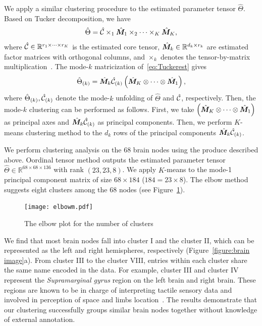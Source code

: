 \documentclass[11pt]{article}
\theoremstyle{plain}
\theoremstyle{definition}
\begin{document}
We apply a similar clustering procedure to the estimated parameter tensor $\hat\Theta$. Based on Tucker decomposition, we have
\begin{equation}\label{eq:Tuckerest}
\hat \Theta = \hat {\mathcal{C}}\times_1\hat {\bm M}_1\times_2\cdots\times_K\hat {\bm M}_K,
\end{equation}
where $\hat {\mathcal{C}}\in\mathbb{R}^{r_1\times \cdots \times r_K}$ is the estimated core tensor, $\hat {\bm M}_k\in\mathbb{R}^{d_k\times r_k}$ are estimated factor matrices with orthogonal columns, and $\times_k$ denotes the tensor-by-matrix multiplication~\citep{kolda2009tensor}. The mode-$k$ matricization of~\eqref{eq:Tuckerest} gives
\begin{equation}
\hat \Theta_{(k)} = \hat {\bm M}_k\hat {\mathcal{C}}_{(k)}\left(\hat {\bm M}_K\otimes\cdots\otimes\hat {\bm M}_1\right),
\end{equation}
where $\hat \Theta_{(k)} , \hat {\mathcal{C}}_{(k)}$ denote the mode-$k$ unfolding of $\hat \Theta$ and $\hat {\mathcal{C}}$, respectively. Then, the mode-$k$ clustering can be performed as follows. First, we take $\left(\hat {\bm M}_K\otimes\cdots\otimes\hat {\bm M}_1\right)$ as principal axes and $\hat {\bm M}_k\hat {\mathcal{C}}_{(k)}$ as principal components. Then, we perform $K$-means clustering method to the $d_k$ rows of the principal components $\hat {\bm M}_k\hat {\mathcal{C}}_{(k)}$.


We perform clustering analysis on the 68 brain nodes using the produce described above. Oordinal tensor method outputs the estimated parameter tensor $\hat\Theta\in\mathbb{R}^{68\times 68\times136}$ with rank $(23,23,8)$. We apply $K$-means to the mode-1 principal component matrix of size $68\times 184$ ($184=23\times8$). The elbow method suggests eight clusters among the 68 nodes (see Figure~\ref{figure:elbow}). 
\begin{figure}[H]
  \label{figure:elbow}
  \begin{center}
    \texttt{[image: elbowm.pdf]}
  \end{center}
  \caption{The elbow plot for the number of clusters}
\end{figure}


We find that most brain nodes fall into cluster I and the cluster II, which can be represented as the left and right hemispheres, respectively (Figure~\ref{figure:brain image}a). From cluster III to the cluster VIII, entries within each cluster share the same name encoded in the data. For example, cluster III and cluster IV represent the {\it Supramarginal gyrus} region on the left brain and right brain. These regions are known to be in charge of interpreting tactile sensory data and involved in perception of space and limbs location~\cite{carlson2012physiology,reed1994nature}.
The results demonstrate that our clustering successfully groups similar brain nodes together without knowledge of external annotation.
\end{document}
